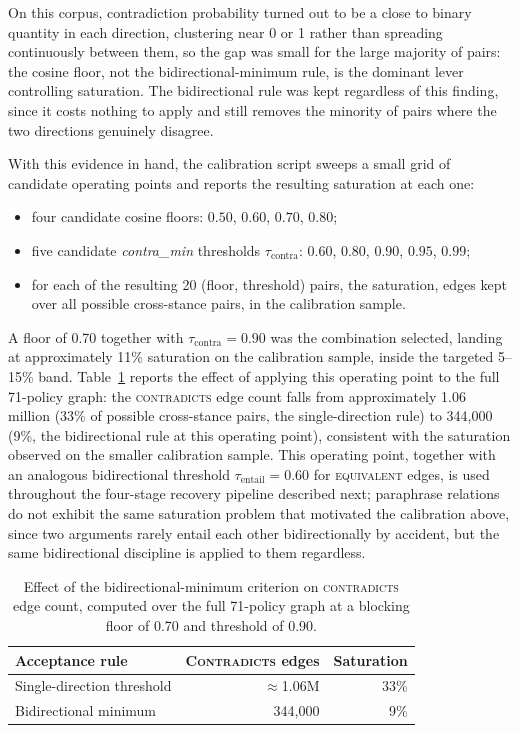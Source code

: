 On this corpus, contradiction probability turned out to be a close to binary quantity in each
direction, clustering near 0 or 1 rather than spreading continuously between them, so the gap was
small for the large majority of pairs: the cosine floor, not the bidirectional-minimum rule, is
the dominant lever controlling saturation. The bidirectional rule was kept regardless of this
finding, since it costs nothing to apply and still removes the minority of pairs where the two
directions genuinely disagree.

With this evidence in hand, the calibration script sweeps a small grid of candidate operating
points and reports the resulting saturation at each one:

\begin{itemize}
\item four candidate cosine floors: $0.50$, $0.60$, $0.70$, $0.80$;
\item five candidate \emph{contra\_min} thresholds $\tau_{\text{contra}}$: $0.60$, $0.80$, $0.90$,
$0.95$, $0.99$;
\item for each of the resulting 20 (floor, threshold) pairs, the saturation, edges kept over all
possible cross-stance pairs, in the calibration sample.
\end{itemize}

A floor of 0.70 together with $\tau_{\text{contra}} = 0.90$ was the combination selected, landing
at approximately 11\% saturation on the calibration sample, inside the targeted 5--15\% band.
Table~\ref{tab:edge-calibration} reports the effect of applying this operating point to the full
71-policy graph: the \textsc{contradicts} edge count falls from approximately 1.06 million (33\%
of possible cross-stance pairs, the single-direction rule) to 344,000 (9\%, the bidirectional rule
at this operating point), consistent with the saturation observed on the smaller calibration
sample. This operating point, together with an analogous bidirectional threshold
$\tau_{\text{entail}} = 0.60$ for \textsc{equivalent} edges, is used throughout the four-stage
recovery pipeline described next; paraphrase relations do not exhibit the same saturation problem
that motivated the calibration above, since two arguments rarely entail each other bidirectionally
by accident, but the same bidirectional discipline is applied to them regardless.

\begin{table}[htbp]
\centering
\caption{Effect of the bidirectional-minimum criterion on \textsc{contradicts} edge count,
computed over the full 71-policy graph at a blocking floor of 0.70 and threshold of 0.90.}
\label{tab:edge-calibration}
\begin{tabular}{lrr}
\toprule
\textbf{Acceptance rule} & \textbf{\textsc{Contradicts} edges} & \textbf{Saturation} \\
\midrule
Single-direction threshold & $\approx$1.06M & 33\% \\
Bidirectional minimum & 344{,}000 & 9\% \\
\bottomrule
\end{tabular}
\end{table}

